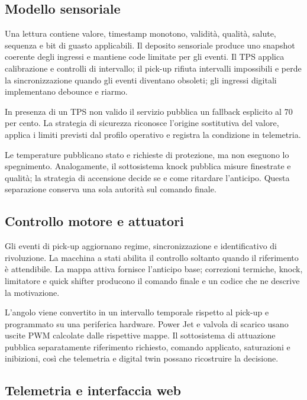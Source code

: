 \documentclass{article}
\begin{document}
\subsection{Modello sensoriale}

Una lettura contiene valore, timestamp monotono, validità, qualità, salute,
sequenza e bit di guasto applicabili. Il deposito sensoriale produce uno
snapshot coerente degli ingressi e mantiene code limitate per gli eventi. Il
TPS applica calibrazione e controlli di intervallo; il pick-up rifiuta intervalli
impossibili e perde la sincronizzazione quando gli eventi diventano obsoleti;
gli ingressi digitali implementano debounce e riarmo.

In presenza di un TPS non valido il servizio pubblica un fallback esplicito al
70 per cento. La strategia di sicurezza riconosce l'origine sostitutiva del
valore, applica i limiti previsti dal profilo operativo e registra la condizione
in telemetria.

Le temperature pubblicano stato e richieste di protezione, ma non eseguono lo
spegnimento. Analogamente, il sottosistema knock pubblica misure finestrate e
qualità; la strategia di accensione decide se e come ritardare
l'anticipo. Questa separazione conserva una sola autorità sul comando finale.

\subsection{Controllo motore e attuatori}

Gli eventi di pick-up aggiornano regime, sincronizzazione e identificativo di
rivoluzione. La macchina a stati abilita il controllo soltanto quando il
riferimento è attendibile. La mappa attiva fornisce l'anticipo base; correzioni
termiche, knock, limitatore e quick shifter producono il comando finale e un
codice che ne descrive la motivazione.

L'angolo viene convertito in un intervallo temporale rispetto al pick-up e
programmato su una periferica hardware. Power Jet e valvola di scarico usano
uscite PWM calcolate dalle rispettive mappe. Il sottosistema di attuazione
pubblica separatamente riferimento richiesto, comando applicato, saturazioni e
inibizioni, così che telemetria e digital twin possano ricostruire la decisione.

\subsection{Telemetria e interfaccia web}
\end{document}
